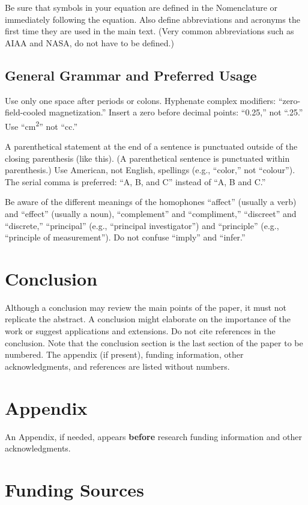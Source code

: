 \documentclass[journal]{new-aiaa}
\begin{document}
Be sure that symbols in your equation are defined in the Nomenclature or immediately following the equation. Also define abbreviations and acronyms the first time they are used in the main text. (Very common abbreviations such as AIAA and NASA, do not have to be defined.)

\subsection{General Grammar and Preferred Usage}
Use only one space after periods or colons. Hyphenate complex modifiers: ``zero-field-cooled magnetization.'' Insert a zero before decimal points: ``0.25,'' not ``.25.'' Use ``\si{\centi\meter\squared}'' not ``cc.'' 

A parenthetical statement at the end of a sentence is punctuated outside of the closing parenthesis (like this). (A parenthetical sentence is punctuated within parenthesis.) Use American, not English, spellings (e.g., “color,” not “colour”). The serial comma is preferred: “A, B, and C” instead of “A, B and C.”

Be aware of the different meanings of the homophones “affect” (usually a verb) and “effect” (usually a noun), “complement” and “compliment,” “discreet” and “discrete,” “principal” (e.g., “principal investigator”) and “principle” (e.g., “principle of measurement”). Do not confuse “imply” and “infer.”

\section{Conclusion}
Although a conclusion may review the main points of the paper, it must not replicate the abstract. A conclusion might elaborate on the importance of the work or suggest applications and extensions. Do not cite references in the conclusion. Note that the conclusion section is the last section of the paper to be numbered. The appendix (if present), funding information, other acknowledgments, and references are listed without numbers.

\section*{Appendix}

An Appendix, if needed, appears \textbf{before} research funding information and other acknowledgments.

\section*{Funding Sources}
\end{document}
